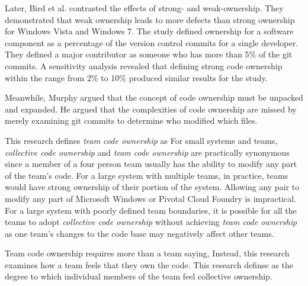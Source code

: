 Later, Bird et al. \cite{BirdDontTouchMyCode} contrasted the effects of strong- and weak-ownership. They demonstrated that weak ownership leads to more defects than strong ownership for Windows Vista and Windows 7. The study defined ownership for a software component as a percentage of the version control commits for a single developer. They defined a major contributor as someone who has more than 5\% of the git commits. A sensitivity analysis revealed that defining strong code ownership within the range from 2\% to 10\% produced similar results for the study.

Meanwhile, Murphy  \cite{MurphyIEEESoftware} argued that the concept of code ownership must be unpacked and expanded. He argued that the complexities of code ownership are missed by merely examining git commits to determine who modified which files.

This research defines \textit{team code ownership} as  For small systems and teams, \textit{collective code ownership} and \textit{team code ownership} are practically synonymous since a member of a four person team usually has the ability to modify any part of the team's code. For a large system with multiple teams, in practice, teams would have strong ownership of their portion of the system. Allowing any pair to modify any part of Microsoft Windows or Pivotal Cloud Foundry is impractical. For a large system with poorly defined team boundaries, it is possible for all the teams to adopt \textit{collective code ownership} without achieving \textit{team code ownership} as one team's changes to the code base may negatively affect other teams.

Team code ownership requires more than a team saying,  Instead, this research examines how a team feels that they own the code. This research definse  as the degree to which individual members of the team feel collective ownership.  

